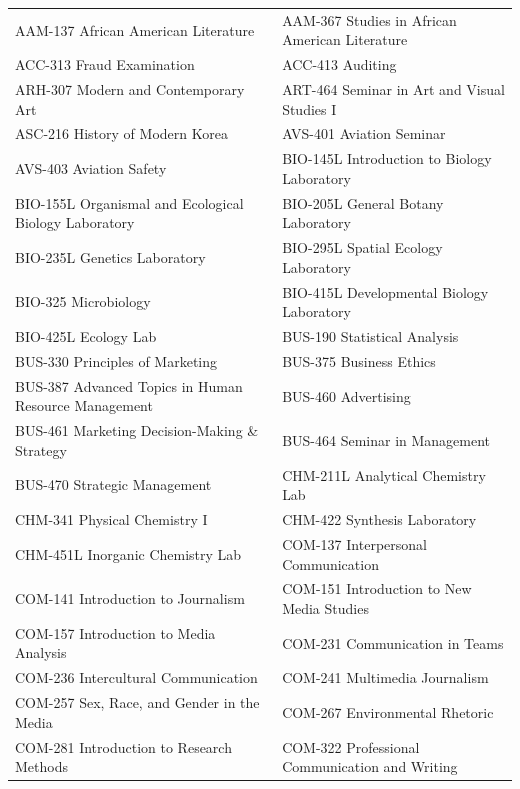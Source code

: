 \documentclass[
  letterpaper,
]{scrbook}
\renewcommand\toprule[2]\relax
\renewcommand\bottomrule[2]\relax
\newcounter{none}
\begin{document}
{\def\LTcaptype{none} %
\begin{longtable}[]{@{}
  >{\raggedright\arraybackslash}p{}
  >{\raggedright\arraybackslash}p{}@{}}
\toprule\noalign{}
\endhead
\bottomrule\noalign{}
\endlastfoot
AAM-137 African American Literature & AAM-367 Studies in African
American Literature \\
ACC-313 Fraud Examination & ACC-413 Auditing \\
ARH-307 Modern and Contemporary Art & ART-464 Seminar in Art and Visual
Studies I \\
ASC-216 History of Modern Korea & AVS-401 Aviation Seminar \\
AVS-403 Aviation Safety & BIO-145L Introduction to Biology Laboratory \\
BIO-155L Organismal and Ecological Biology Laboratory & BIO-205L General
Botany Laboratory \\
BIO-235L Genetics Laboratory & BIO-295L Spatial Ecology Laboratory \\
BIO-325 Microbiology & BIO-415L Developmental Biology Laboratory \\
BIO-425L Ecology Lab & BUS-190 Statistical Analysis \\
BUS-330 Principles of Marketing & BUS-375 Business Ethics \\
BUS-387 Advanced Topics in Human Resource Management & BUS-460
Advertising \\
BUS-461 Marketing Decision-Making \& Strategy & BUS-464 Seminar in
Management \\
BUS-470 Strategic Management & CHM-211L Analytical Chemistry Lab \\
CHM-341 Physical Chemistry I & CHM-422 Synthesis Laboratory \\
CHM-451L Inorganic Chemistry Lab & COM-137 Interpersonal
Communication \\
COM-141 Introduction to Journalism & COM-151 Introduction to New Media
Studies \\
COM-157 Introduction to Media Analysis & COM-231 Communication in
Teams \\
COM-236 Intercultural Communication & COM-241 Multimedia Journalism \\
COM-257 Sex, Race, and Gender in the Media & COM-267 Environmental
Rhetoric \\
COM-281 Introduction to Research Methods & COM-322 Professional
Communication and Writing \\

\end{longtable}}
\end{document}
